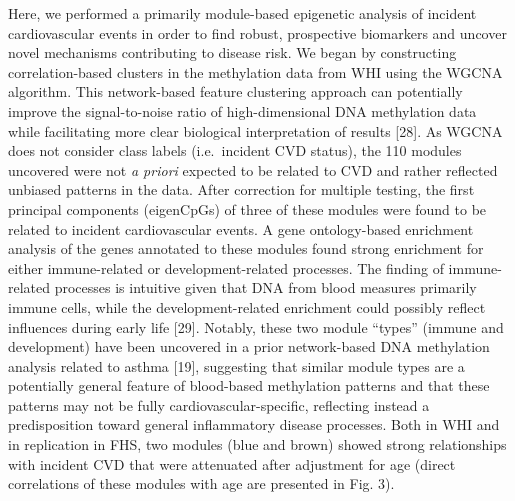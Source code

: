 \documentclass[]{article}
\theoremstyle{definition}
\theoremstyle{definition}
\theoremstyle{definition}
\theoremstyle{remark}
\begin{document}
Here, we performed a primarily module-based epigenetic analysis of
incident cardiovascular events in order to find robust, prospective
biomarkers and uncover novel mechanisms contributing to disease risk. We
began by constructing correlation-based clusters in the methylation data
from WHI using the WGCNA algorithm. This network-based feature
clustering approach can potentially improve the signal-to-noise ratio of
high-dimensional DNA methylation data while facilitating more clear
biological interpretation of results {[}28{]}. As WGCNA does not
consider class labels (i.e.~incident CVD status), the 110 modules
uncovered were not \emph{a priori} expected to be related to CVD and
rather reflected unbiased patterns in the data. After correction for
multiple testing, the first principal components (eigenCpGs) of three of
these modules were found to be related to incident cardiovascular
events. A gene ontology-based enrichment analysis of the genes annotated
to these modules found strong enrichment for either immune-related or
development-related processes. The finding of immune-related processes
is intuitive given that DNA from blood measures primarily immune cells,
while the development-related enrichment could possibly reflect
influences during early life {[}29{]}. Notably, these two module
``types'' (immune and development) have been uncovered in a prior
network-based DNA methylation analysis related to asthma {[}19{]},
suggesting that similar module types are a potentially general feature
of blood-based methylation patterns and that these patterns may not be
fully cardiovascular-specific, reflecting instead a predisposition
toward general inflammatory disease processes. Both in WHI and in
replication in FHS, two modules (blue and brown) showed strong
relationships with incident CVD that were attenuated after adjustment
for age (direct correlations of these modules with age are presented in
Fig. 3).
\end{document}

